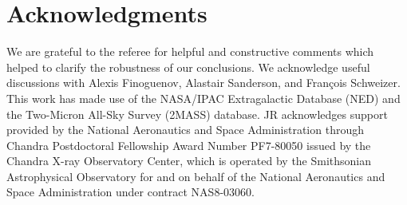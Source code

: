 \documentclass[useAMS,usenatbib]{mn2e}
\begin{document}
 
 
\section*{Acknowledgments} 
 
We are grateful to the referee for helpful and constructive comments
which helped to clarify the robustness of our conclusions. We
acknowledge useful discussions with Alexis Finoguenov, Alastair
Sanderson, and Fran\c{c}ois Schweizer. This work has made use of the
NASA/IPAC Extragalactic Database (NED) and the Two-Micron All-Sky
Survey (2MASS) database. JR acknowledges support provided by the
National Aeronautics and Space Administration through Chandra
Postdoctoral Fellowship Award Number PF7-80050 issued by the Chandra
X-ray Observatory Center, which is operated by the Smithsonian
Astrophysical Observatory for and on behalf of the National
Aeronautics and Space Administration under contract NAS8-03060.
\end{document}

